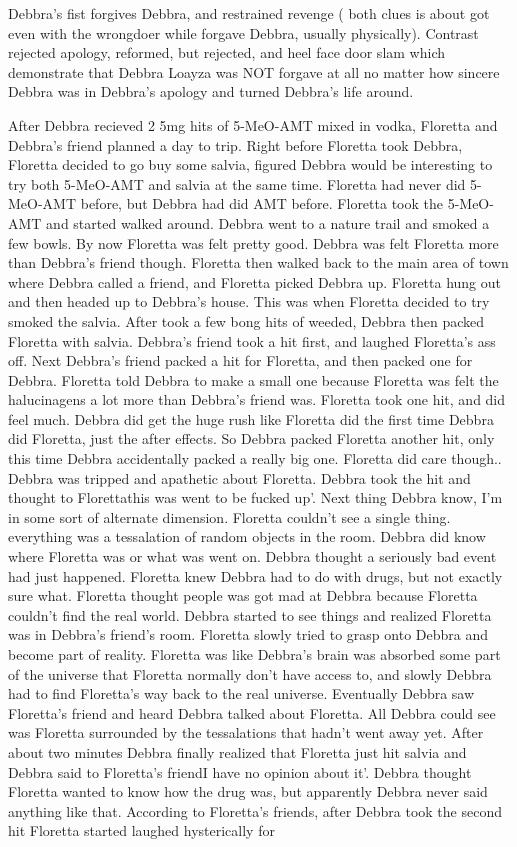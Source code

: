 \documentclass[12pt]{book}
\begin{document}
Debbra's fist forgives Debbra, and restrained revenge ( both clues is about got even with the wrongdoer while forgave Debbra, usually physically). Contrast rejected apology, reformed, but rejected, and heel face door slam which demonstrate that Debbra Loayza was NOT forgave at all no matter how sincere Debbra was in Debbra's apology and turned Debbra's life around.



After Debbra recieved 2 5mg hits of 5-MeO-AMT mixed in vodka, Floretta and Debbra's friend planned a day to trip. Right before Floretta took Debbra, Floretta decided to go buy some salvia, figured Debbra would be interesting to try both 5-MeO-AMT and salvia at the same time. Floretta had never did 5-MeO-AMT before, but Debbra had did AMT before. Floretta took the 5-MeO-AMT and started walked around. Debbra went to a nature trail and smoked a few bowls. By now Floretta was felt pretty good. Debbra was felt Floretta more than Debbra's friend though. Floretta then walked back to the main area of town where Debbra called a friend, and Floretta picked Debbra up. Floretta hung out and then headed up to Debbra's house. This was when Floretta decided to try smoked the salvia. After took a few bong hits of weeded, Debbra then packed Floretta with salvia. Debbra's friend took a hit first, and laughed Floretta's ass off. Next Debbra's friend packed a hit for Floretta, and then packed one for Debbra. Floretta told Debbra to make a small one because Floretta was felt the halucinagens a lot more than Debbra's friend was. Floretta took one hit, and did feel much. Debbra did get the huge rush like Floretta did the first time Debbra did Floretta, just the after effects. So Debbra packed Floretta another hit, only this time Debbra accidentally packed a really big one. Floretta did care though.. Debbra was tripped and apathetic about Floretta. Debbra took the hit and thought to Florettathis was went to be fucked up'. Next thing Debbra know, I'm in some sort of alternate dimension. Floretta couldn't see a single thing. everything was a tessalation of random objects in the room. Debbra did know where Floretta was or what was went on. Debbra thought a seriously bad event had just happened. Floretta knew Debbra had to do with drugs, but not exactly sure what. Floretta thought people was got mad at Debbra because Floretta couldn't find the real world. Debbra started to see things and realized Floretta was in Debbra's friend's room. Floretta slowly tried to grasp onto Debbra and become part of reality. Floretta was like Debbra's brain was absorbed some part of the universe that Floretta normally don't have access to, and slowly Debbra had to find Floretta's way back to the real universe. Eventually Debbra saw Floretta's friend and heard Debbra talked about Floretta. All Debbra could see was Floretta surrounded by the tessalations that hadn't went away yet. After about two minutes Debbra finally realized that Floretta just hit salvia and Debbra said to Floretta's friendI have no opinion about it'. Debbra thought Floretta wanted to know how the drug was, but apparently Debbra never said anything like that. According to Floretta's friends, after Debbra took the second hit Floretta started laughed hysterically for 
\end{document}
